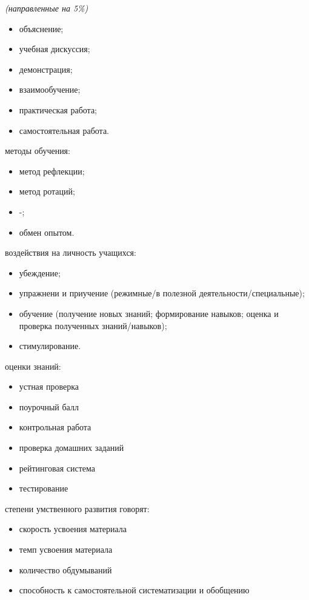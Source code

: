 \documentclass[12pt]{article}			%
\begin{document}
	\begin{small}{\it(направленные на 5\%)}\end{small}
	\begin{itemize}
		\item объяснение;
		\item учебная дискуссия;
		\item демонстрация;
		\item взаимообучение;
		\item практическая работа;
		\item самостоятельная работа.
	\end{itemize}
	
	
	{ методы обучения:}
	
	\begin{itemize}
		\item метод рефлекции;
		\item метод ротаций;
		\item {}\dq-\dqведомый\dq;
		\item обмен опытом.
	\end{itemize}
	
	{ воздействия на личность учащихся:}
	
	\begin{itemize}
		\item убеждение;
		\item упражнени и приучение (режимные/в полезной деятельности/специальные);
		\item обучение (получение новых знаний; формирование навыков; оценка и проверка полученных знаний/навыков);
		\item стимулирование.
	\end{itemize}
	
	{ оценки знаний:}
	
	\begin{itemize}
		\item устная проверка
		\item поурочный балл
		\item контрольная работа
		\item проверка домашних заданий
		\item рейтинговая система
		\item тестирование
	\end{itemize}
	
	{ степени умственного развития говорят:}
	
	\begin{itemize}
		\item скорость усвоения материала
		\item темп усвоения материала
		\item количество обдумываний
		\item способность к самостоятельной систематизации и обобщению
	\end{itemize}
	
\end{document}
